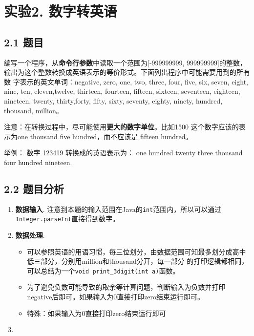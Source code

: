 \vspace{-3cm}\chapter{实验2. 数字转英语}

\section{2.1 题目}

编写一个程序，从\textbf{命令行参数}中读取一个范围为[-999999999,  999999999]的整数，
输出为这个整数转换成英语表示的等价形式。下面列出程序中可能需要用到的所有数
字表示的英文单词：negative, zero, one, two, three, four, five, six, seven, eight, nine, ten, 
eleven,twelve,  thirteen,  fourteen,  fifteen,  sixteen,  seventeen,  eighteen,  nineteen,  twenty,  
thirty,forty, fifty, sixty, seventy, eighty, ninety, hundred, thousand, million。

注意：在转换过程中，尽可能使用\textbf{更大的数字单位}。比如1500 这个数字应该的表示为one thousand 
five hundred，而不应该是 fifteen hundred。

举例： 
数字 123419 转换成的英语表示为： 
one hundred twenty three thousand four hundred nineteen.

\section{2.2 题目分析}

\begin{enumerate}
    \item \textbf{数据输入}. 注意到本题的输入范围在Java的\lstinline{int}范围内，所以可以通过\lstinline{Integer.parseInt}直接得到数字。
    \item \textbf{数据处理}. 
    \begin{itemize}
        \item 可以参照英语的用语习惯，每三位划分，由数据范围可知最多划分成高中低三部分，分别用million和thousand分开，每一部分
            的打印逻辑都相同，可以总结为一个\lstinline{void print_3digit(int a)}函数。
        \item 为了避免负数可能导致的取余等计算问题，判断输入为负数并打印negative后即可。如果输入为0直接打印zero结束运行即可。
        \item 特殊：如果输入为0直接打印zero结束运行即可
    \end{itemize}
    \item 
\end{enumerate}

